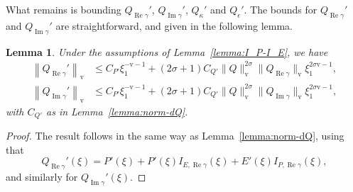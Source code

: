 \documentclass[11pt]{article}
\DeclareMathOperator{\real}{Re}
\DeclareMathOperator{\imag}{Im}
\newcommand{\normv}{\mathrm{v}}
\newtheorem{lemma}[definition]{Lemma}
\begin{document}
What remains is bounding \(Q_{\real\gamma}'\), \(Q_{\imag\gamma}'\),
\(Q_{\kappa}'\) and \(Q_{\epsilon}'\). The bounds for
\(Q_{\real\gamma}'\) and \(Q_{\imag\gamma}'\) are straightforward, and
given in the following lemma.
\begin{lemma}\label{lemma:norm-Q-dgamma-dxi}
  Under the assumptions of Lemma~\ref{lemma:I_P-I_E}, we have
  \begin{align*}
    \left\|Q_{\real\gamma}'\right\|_{\normv}
    &\leq C_{P'}\xi_{1}^{-\normv - 1}
      + (2\sigma + 1)C_{Q'}\|Q\|_{\normv}^{2\sigma}\|Q_{\real\gamma}\|_{\normv}\xi_{1}^{2\sigma\normv - 1},\\
    \left\|Q_{\imag\gamma}'\right\|_{\normv}
    &\leq C_{P'}\xi_{1}^{-\normv - 1}
      + (2\sigma + 1)C_{Q'}\|Q\|_{\normv}^{2\sigma}\|Q_{\imag\gamma}\|_{\normv}\xi_{1}^{2\sigma\normv - 1},
  \end{align*}
  with \(C_{Q'}\) as in Lemma~\ref{lemma:norm-dQ}.
\end{lemma}

\begin{proof}
  The result follows in the same way as Lemma~\ref{lemma:norm-dQ},
  using that
  \begin{equation*}
    Q_{\real\gamma}'(\xi)
    = P'(\xi)
    + P'(\xi)I_{E,\real\gamma}(\xi)
    + E'(\xi)I_{P,\real\gamma}(\xi),
  \end{equation*}
  and similarly for \(Q_{\imag\gamma}'(\xi)\).
\end{proof}
\end{document}
